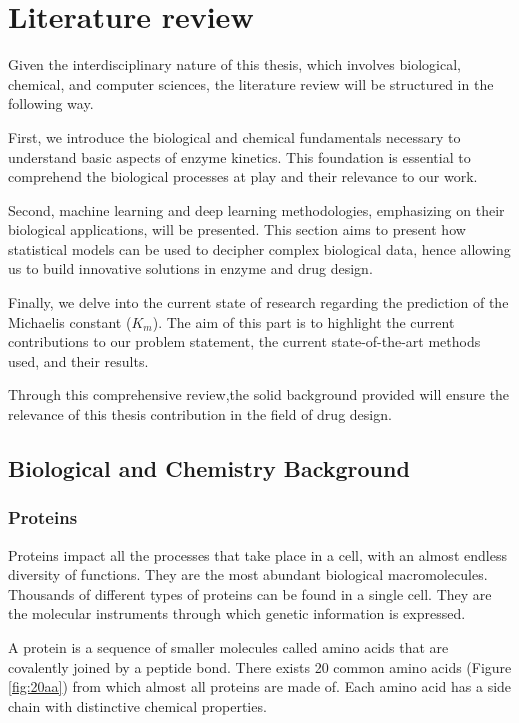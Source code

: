 \section{Literature review}

Given the interdisciplinary nature of this thesis, which involves biological, chemical, and 
computer sciences, the literature review will be structured in the following way.

First, we introduce the biological and chemical fundamentals necessary to understand basic aspects
of enzyme kinetics. This foundation is essential to comprehend the biological processes at play and
their relevance to our work.

Second, machine learning and deep learning methodologies, emphasizing on their biological
applications, will be presented. This section aims to present how statistical models can be used to decipher complex biological
data, hence allowing us to build innovative solutions in enzyme and drug design.

Finally, we delve into the current state of research regarding the prediction of the Michaelis 
constant ($K_m$). The aim of this part is to highlight the current contributions to 
our problem statement, the current state-of-the-art methods used, and their results.

Through this comprehensive review,the solid background provided will ensure the relevance of this thesis
contribution in the field of drug design.

\subsection{Biological and Chemistry Background}
\subsubsection{Proteins}
Proteins impact all the processes that take place in a cell, with an almost
endless diversity of functions. They are the most abundant biological macromolecules.
Thousands of different types of proteins can be found in a single cell. They are the molecular
instruments through which genetic information is expressed.\cite{lehninger}

A protein is a sequence of smaller molecules called amino acids that are covalently joined by a peptide
bond. There exists 20 common amino acids (Figure \ref{fig:20aa}) from which almost all proteins are made of. Each amino acid has
a side chain with distinctive chemical properties.

